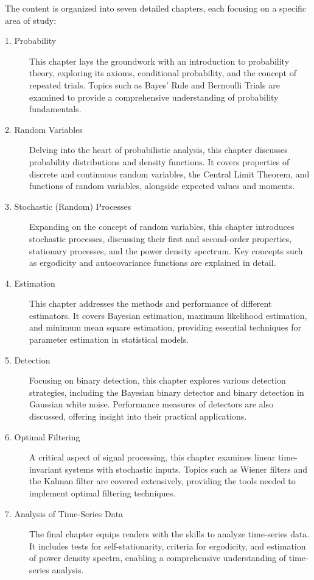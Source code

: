 \documentclass[12pt]{book}
\theoremstyle{definition}
\begin{document}
The content is organized into seven detailed chapters, each focusing on a specific area of study:

\begin{description}
    \item[1. Probability] This chapter lays the groundwork with an introduction to probability theory, exploring its axioms, conditional probability, and the concept of repeated trials. Topics such as Bayes' Rule and Bernoulli Trials are examined to provide a comprehensive understanding of probability fundamentals.
    
    \item[2. Random Variables] Delving into the heart of probabilistic analysis, this chapter discusses probability distributions and density functions. It covers properties of discrete and continuous random variables, the Central Limit Theorem, and functions of random variables, alongside expected values and moments.
    
    \item[3. Stochastic (Random) Processes] Expanding on the concept of random variables, this chapter introduces stochastic processes, discussing their first and second-order properties, stationary processes, and the power density spectrum. Key concepts such as ergodicity and autocovariance functions are explained in detail.
    
    \item[4. Estimation] This chapter addresses the methods and performance of different estimators. It covers Bayesian estimation, maximum likelihood estimation, and minimum mean square estimation, providing essential techniques for parameter estimation in statistical models.
    
    \item[5. Detection] Focusing on binary detection, this chapter explores various detection strategies, including the Bayesian binary detector and binary detection in Gaussian white noise. Performance measures of detectors are also discussed, offering insight into their practical applications.
    
    \item[6. Optimal Filtering] A critical aspect of signal processing, this chapter examines linear time-invariant systems with stochastic inputs. Topics such as Wiener filters and the Kalman filter are covered extensively, providing the tools needed to implement optimal filtering techniques.
    
    \item[7. Analysis of Time-Series Data] The final chapter equips readers with the skills to analyze time-series data. It includes tests for self-stationarity, criteria for ergodicity, and estimation of power density spectra, enabling a comprehensive understanding of time-series analysis.
\end{description}
\end{document}
